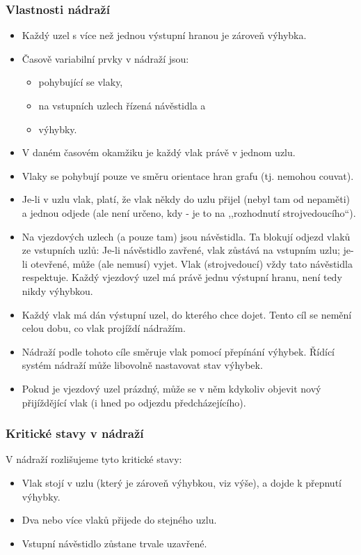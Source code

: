 \documentclass[a4paper,journal]{IEEEtran}
\begin{document}
\subsubsection{Vlastnosti nádraží}
\begin{itemize}
	\item Každý uzel s více než jednou výstupní hranou je zároveň výhybka.
	\item Časově variabilní prvky v nádraží jsou:
	\begin{itemize}
		\item pohybující se vlaky,
		\item na vstupních uzlech řízená návěstidla a
		\item výhybky.
	\end{itemize}
	\item V daném časovém okamžiku je každý vlak právě v jednom uzlu.
	\item Vlaky se pohybují pouze ve směru orientace hran grafu (tj. nemohou couvat).
	\item Je-li v uzlu vlak, platí, že vlak někdy do uzlu přijel (nebyl tam od nepaměti) 
	a jednou odjede (ale není určeno, kdy - je to na ,,rozhodnutí strojvedoucího``).
	\item Na vjezdových uzlech (a pouze tam) jsou návěstidla. Ta blokují odjezd vlaků 
	ze vstupních uzlů: Je-li návěstidlo zavřené, vlak zůstává na vstupním uzlu; 
	je-li otevřené, může (ale nemusí) vyjet. Vlak (strojvedoucí) vždy tato návěstidla 
	respektuje. Každý vjezdový uzel má právě jednu výstupní hranu, není tedy nikdy výhybkou.
	\item Každý vlak má dán výstupní uzel, do kterého chce dojet. Tento cíl se nemění 
	celou dobu, co vlak projíždí nádražím.
	\item Nádraží podle tohoto cíle směruje vlak pomocí přepínání výhybek. 
	Řídící systém nádraží může libovolně nastavovat stav výhybek.
	\item Pokud je vjezdový uzel prázdný, může se v něm kdykoliv objevit nový 
	přijíždějící vlak (i hned po odjezdu předcházejícího).
\end{itemize}

\subsubsection{Kritické stavy v nádraží}
V nádraží rozlišujeme tyto kritické stavy:
\begin{itemize}
	\item Vlak stojí v uzlu (který je zároveň výhybkou, viz výše), a dojde k přepnutí výhybky.
	\item Dva nebo více vlaků přijede do stejného uzlu.
	\item Vstupní návěstidlo zůstane trvale uzavřené.
\end{itemize}
\end{document}
